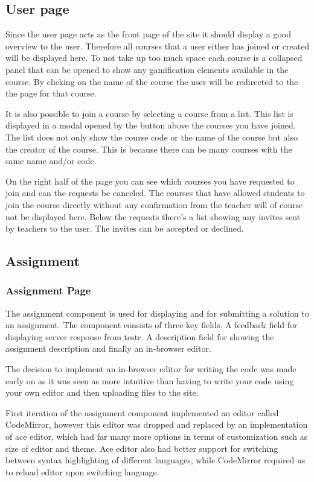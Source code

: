 \subsection{User page}
Since the user page acts as the front page of the site it should display a good overview to the user. Therefore all courses that a user either has joined or created will be displayed here. To not take up too much space each course is a collapsed panel that can be opened to show any gamification elements available in the course. By clicking on the name of the course the user will be redirected to the the page for that course.

It is also possible to join a course by selecting a course from a list. This list is displayed in a modal opened by the button above the courses you have joined.  The list does not only show the course code or the name of the course but also the creator of the course. This is because there can be many courses with the same name and/or code.

On the right half of the page you can see which courses you have requested to join and can the requests be canceled. The courses that have allowed students to join the course directly without any confirmation from the teacher will of course not be displayed here. Below the requests there's a list showing any invites sent by teachers to the user. The invites can be accepted or declined.

\subsection{Assignment}
\subsubsection{Assignment Page}
The assignment component is used for displaying and for submitting a solution to an assignment. The component consists of three key fields. A feedback field for displaying server response from testr. A description field for showing the assignment description and finally an in-browser editor. 

The decision to implement an in-browser editor for writing the code was made early on as it was seen as more intuitive than having to write your code using your own editor and then uploading files to the site.

First iteration of the assignment component implemented an editor called CodeMirror, however this editor was dropped and replaced by an implementation of ace editor, which had far many more options in terms of customization such as size of editor and theme. Ace editor also had better support for switching between syntax highlighting of different languages, while CodeMirror required us to reload editor upon switching language. 

